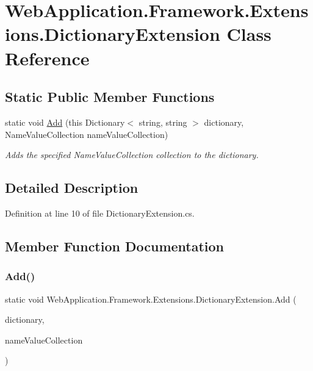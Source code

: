 \hypertarget{classWebApplication_1_1Framework_1_1Extensions_1_1DictionaryExtension}{}\section{Web\+Application.\+Framework.\+Extensions.\+Dictionary\+Extension Class Reference}
\label{classWebApplication_1_1Framework_1_1Extensions_1_1DictionaryExtension}
\subsection*{Static Public Member Functions}
\begin{DoxyCompactItemize}
\item 
static void \mbox{\hyperlink{classWebApplication_1_1Framework_1_1Extensions_1_1DictionaryExtension_a64fba34f53010c5bda7600c88a779078}{Add}} (this Dictionary$<$ string, string $>$ dictionary, Name\+Value\+Collection name\+Value\+Collection)
\begin{DoxyCompactList}\small\item\em Adds the specified {\ttfamily Name\+Value\+Collection} collection to the dictionary. \end{DoxyCompactList}\end{DoxyCompactItemize}


\subsection{Detailed Description}


Definition at line 10 of file Dictionary\+Extension.\+cs.



\subsection{Member Function Documentation}
\mbox{\label{classWebApplication_1_1Framework_1_1Extensions_1_1DictionaryExtension_a64fba34f53010c5bda7600c88a779078}} 
\subsubsection{\texorpdfstring{Add()}{Add()}}
{\footnotesize\ttfamily static void Web\+Application.\+Framework.\+Extensions.\+Dictionary\+Extension.\+Add (\begin{DoxyParamCaption}\item[{this Dictionary$<$ string, string $>$}]{dictionary,  }\item[{Name\+Value\+Collection}]{name\+Value\+Collection }\end{DoxyParamCaption})\hspace{0.3cm}{\ttfamily [static]}}



